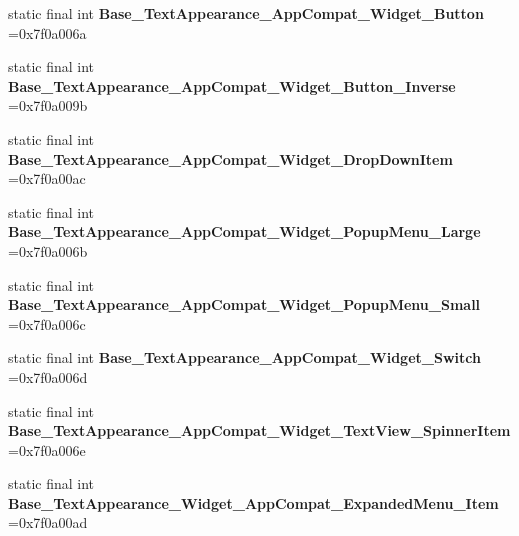 \begin{DoxyCompactItemize}
static final int {\bfseries Base\+\_\+\+Text\+Appearance\+\_\+\+App\+Compat\+\_\+\+Widget\+\_\+\+Button} =0x7f0a006a
\item 
\mbox{\label{classproject4_1_1xaria_1_1R_1_1style_af34404d9787ed833e50016f3ca5d3201}} 
static final int {\bfseries Base\+\_\+\+Text\+Appearance\+\_\+\+App\+Compat\+\_\+\+Widget\+\_\+\+Button\+\_\+\+Inverse} =0x7f0a009b
\item 
\mbox{\label{classproject4_1_1xaria_1_1R_1_1style_a444e4ebe91f29fefdbe0cc397194b6cf}} 
static final int {\bfseries Base\+\_\+\+Text\+Appearance\+\_\+\+App\+Compat\+\_\+\+Widget\+\_\+\+Drop\+Down\+Item} =0x7f0a00ac
\item 
\mbox{\label{classproject4_1_1xaria_1_1R_1_1style_a1819182812a6176337fde87a16cf3abd}} 
static final int {\bfseries Base\+\_\+\+Text\+Appearance\+\_\+\+App\+Compat\+\_\+\+Widget\+\_\+\+Popup\+Menu\+\_\+\+Large} =0x7f0a006b
\item 
\mbox{\label{classproject4_1_1xaria_1_1R_1_1style_ae6ccb0ad8184728547addfbefe162323}} 
static final int {\bfseries Base\+\_\+\+Text\+Appearance\+\_\+\+App\+Compat\+\_\+\+Widget\+\_\+\+Popup\+Menu\+\_\+\+Small} =0x7f0a006c
\item 
\mbox{\label{classproject4_1_1xaria_1_1R_1_1style_ac4affe70dec60155223037eecff50004}} 
static final int {\bfseries Base\+\_\+\+Text\+Appearance\+\_\+\+App\+Compat\+\_\+\+Widget\+\_\+\+Switch} =0x7f0a006d
\item 
\mbox{\label{classproject4_1_1xaria_1_1R_1_1style_a520ebf6eb7b9ad9ddfd123f32c3174f3}} 
static final int {\bfseries Base\+\_\+\+Text\+Appearance\+\_\+\+App\+Compat\+\_\+\+Widget\+\_\+\+Text\+View\+\_\+\+Spinner\+Item} =0x7f0a006e
\item 
\mbox{\label{classproject4_1_1xaria_1_1R_1_1style_ae57494da82e3cbcc214ad0f314e30b5c}} 
static final int {\bfseries Base\+\_\+\+Text\+Appearance\+\_\+\+Widget\+\_\+\+App\+Compat\+\_\+\+Expanded\+Menu\+\_\+\+Item} =0x7f0a00ad
\item 

\end{DoxyCompactItemize}
